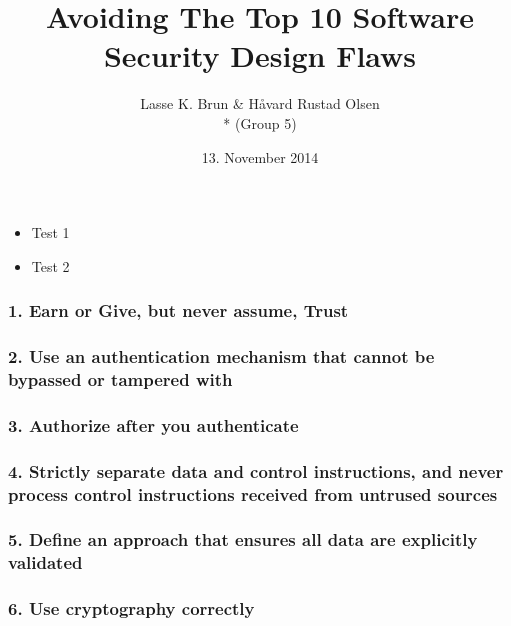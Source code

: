 \documentclass[t]{beamer}
\title[Avoiding The Top 10 Software Security Design Flaws]{Avoiding The Top 10 Software Security Design Flaws}
\author{Lasse K. Brun \& Håvard Rustad Olsen \\* (Group 5)} %
\institute[UiB]
{
\medskip
\textit{lkbrun@gmail.com \& haavard.olsen@live.com} \\* %
\textit{INF226 - Software Security, Fall 2014 }
}
\date{13. November 2014} %
\begin{document}
 

\begin{frame}
\titlepage %
\end{frame}


\begin{frame}
	\begin{itemize}
		\item Test 1
		\item Test 2
	\end{itemize}		

\end{frame}

\begin{frame}

	\frametitle{1. Earn or Give, but never assume, Trust}
	

\end{frame}

\begin{frame}

	\frametitle{2. Use an authentication mechanism that cannot be bypassed or tampered with}
	

\end{frame}

\begin{frame}

	\frametitle{3. Authorize after you authenticate}
	

\end{frame}

\begin{frame}

	\frametitle{4. Strictly separate data and control instructions, and never process control instructions received from untrused sources}
	

\end{frame}

\begin{frame}

	\frametitle{5. Define an approach that ensures all data are explicitly validated}
	

\end{frame}

\begin{frame}

	\frametitle{6. Use cryptography correctly}
	

\end{frame}
\end{document}
